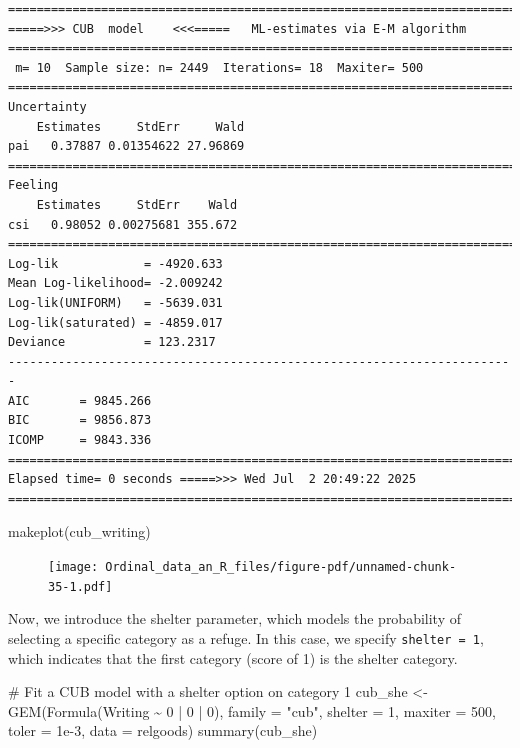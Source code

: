 \documentclass[
  letterpaper,
  DIV=11,
  numbers=noendperiod]{scrartcl}
\newenvironment{Shaded}{\begin{snugshade}}{\end{snugshade}}
\newcommand{\AttributeTok}[1]{\textcolor[rgb]{0.40,0.45,0.13}{#1}}
\newcommand{\CommentTok}[1]{\textcolor[rgb]{0.37,0.37,0.37}{#1}}
\newcommand{\DecValTok}[1]{\textcolor[rgb]{0.68,0.00,0.00}{#1}}
\newcommand{\FloatTok}[1]{\textcolor[rgb]{0.68,0.00,0.00}{#1}}
\newcommand{\FunctionTok}[1]{\textcolor[rgb]{0.28,0.35,0.67}{#1}}
\newcommand{\NormalTok}[1]{\textcolor[rgb]{0.00,0.23,0.31}{#1}}
\newcommand{\OtherTok}[1]{\textcolor[rgb]{0.00,0.23,0.31}{#1}}
\newcommand{\SpecialCharTok}[1]{\textcolor[rgb]{0.37,0.37,0.37}{#1}}
\newcommand{\StringTok}[1]{\textcolor[rgb]{0.13,0.47,0.30}{#1}}
\begin{document}
\begin{verbatim}
======================================================================= 
=====>>> CUB  model    <<<=====   ML-estimates via E-M algorithm   
======================================================================= 
 m= 10  Sample size: n= 2449  Iterations= 18  Maxiter= 500 
======================================================================= 
Uncertainty                                            
    Estimates     StdErr     Wald
pai   0.37887 0.01354622 27.96869
======================================================================= 
Feeling                                            
    Estimates     StdErr    Wald
csi   0.98052 0.00275681 355.672
======================================================================= 
Log-lik            = -4920.633 
Mean Log-likelihood= -2.009242 
Log-lik(UNIFORM)   = -5639.031 
Log-lik(saturated) = -4859.017 
Deviance           = 123.2317 
----------------------------------------------------------------------- 
AIC       = 9845.266 
BIC       = 9856.873 
ICOMP     = 9843.336 
======================================================================= 
Elapsed time= 0 seconds =====>>> Wed Jul  2 20:49:22 2025 
======================================================================= 
\end{verbatim}

\begin{Shaded}
\begin{Highlighting}[]
\FunctionTok{makeplot}\NormalTok{(cub\_writing)}
\end{Highlighting}
\end{Shaded}

\begin{figure}[H]

{\centering \texttt{[image: Ordinal\_data\_an\_R\_files/figure-pdf/unnamed-chunk-35-1.pdf]}

}

\end{figure}

Now, we introduce the shelter parameter, which models the probability of
selecting a specific category as a refuge. In this case, we specify
\texttt{shelter\ =\ 1}, which indicates that the first category (score
of 1) is the shelter category.

\begin{Shaded}
\begin{Highlighting}[]
\CommentTok{\# Fit a CUB model with a shelter option on category 1}
\NormalTok{cub\_she }\OtherTok{\textless{}{-}} \FunctionTok{GEM}\NormalTok{(}\FunctionTok{Formula}\NormalTok{(Writing }\SpecialCharTok{\textasciitilde{}} \DecValTok{0} \SpecialCharTok{|} \DecValTok{0} \SpecialCharTok{|} \DecValTok{0}\NormalTok{), }\AttributeTok{family =} \StringTok{"cub"}\NormalTok{, }\AttributeTok{shelter =} \DecValTok{1}\NormalTok{,}
               \AttributeTok{maxiter =} \DecValTok{500}\NormalTok{, }\AttributeTok{toler =} \FloatTok{1e{-}3}\NormalTok{, }\AttributeTok{data =}\NormalTok{ relgoods)}
\FunctionTok{summary}\NormalTok{(cub\_she)}
\end{Highlighting}
\end{Shaded}
\end{document}
